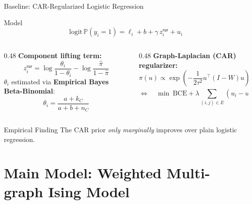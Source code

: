 \documentclass[10pt]{beamer}
\begin{document}
\begin{frame}{Baseline: CAR-Regularized Logistic Regression}
  \begin{block}{Model}
    \[
      \text{logit}\,\mathbb{P}(y_i = 1)
      = \ell_i + b + \gamma\, z_i^{\textsf{rur}} + u_i
    \]
  \end{block}

  \begin{columns}[T]
    \begin{column}{0.48\textwidth}
      \textbf{Component lifting term:}
      \[
        z_i^{\textsf{rur}} = \log\frac{\theta_i}{1-\theta_i} - \log\frac{\hat\pi}{1-\hat\pi}
      \]
      $\theta_i$ estimated via \textbf{Empirical Bayes Beta-Binomial}:
      \[
        \theta_i = \frac{a + k_C}{a + b + n_C}
      \]
    \end{column}
    \begin{column}{0.48\textwidth}
      \textbf{Graph-Laplacian (CAR) regularizer:}
      \[
        \pi(u) \propto \exp\left(-\frac{1}{2\tau^2} u^\top(I-W)u\right)
      \]
      \[
        \Leftrightarrow \quad \min\ \text{BCE} + \lambda \sum_{(i,j)\in E}(u_i - u_j)^2
      \]
    \end{column}
  \end{columns}

  \vspace{0.6em}
  \begin{alertblock}{Empirical Finding}
    The CAR prior \emph{only marginally} improves over plain logistic regression.
  \end{alertblock}
\end{frame}

\section{Main Model: Weighted Multi-graph Ising Model}
\end{document}

